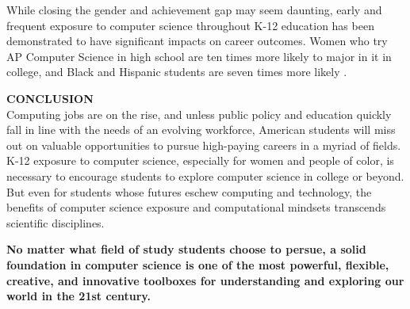 While closing the gender and achievement gap may seem daunting, early and frequent exposure to computer science throughout K-12 education has been demonstrated to have significant impacts on career outcomes. Women who try AP Computer Science in high school are ten times more likely to major in it in college, and Black and Hispanic students are seven times more likely \cite{apfive}. \par
\textbf{CONCLUSION} \\
Computing jobs are on the rise, and unless public policy and education quickly fall in line with the needs of an evolving workforce, American students will miss out on valuable opportunities to pursue high-paying careers in a myriad of fields. K-12 exposure to computer science, especially for women and people of color, is necessary to encourage students to explore computer science in college or beyond. But even for students whose futures eschew computing and technology, the benefits of computer science exposure and computational mindsets transcends scientific disciplines. 
\begin{blockquote}
	\textbf{No matter what field of study students choose to persue, a solid foundation in computer science is one of the most powerful, flexible, creative, and innovative toolboxes for understanding and exploring our world in the 21st century.}
	\end{blockquote}




